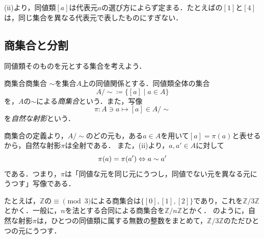 (ii)より，同値類$[a]$は代表元$a$の選び方によらず定まる．たとえばの$[1]$と$[4]$は，同じ集合を異なる代表元で表したものにすぎない．

\subsection{商集合と分割}

同値類そのものを元とする集合を考えよう．

\begin{definition}{商集合}{商集合}
  $\sim$を集合$A$上の同値関係とする．同値類全体の集合
  \[
    A / {\sim} \coloneqq \{ [a] \mid a \in A \}
  \]
  を，$A$の$\sim$による\emph{商集合}という．また，写像
  \[
    \pi \colon A \ni a \mapsto [a] \in A / {\sim}
  \]
  を\emph{自然な射影}という．
\end{definition}

商集合の定義より，$A / {\sim}$のどの元も，ある$a \in A$を用いて$[a] = \pi(a)$と表せるから，自然な射影$\pi$は全射である．
また，(ii)より，$a, a' \in A$に対して
\[
  \pi(a) = \pi(a') \mathrel{\Leftrightarrow} a \sim a'
\]
である．つまり，$\pi$は「同値な元を同じ元にうつし，同値でない元を異なる元にうつす」写像である．

たとえば，$\mathbb{Z}$の$\equiv \pmod{3}$による商集合は$\{ [0], [1], [2] \}$であり，これを$\mathbb{Z}/3\mathbb{Z}$とかく．一般に，$n$を法とする合同による商集合を$\mathbb{Z}/n\mathbb{Z}$とかく．
のように，自然な射影$\pi$は，ひとつの同値類に属する無数の整数をまとめて，$\mathbb{Z}/3\mathbb{Z}$のただひとつの元にうつす．

